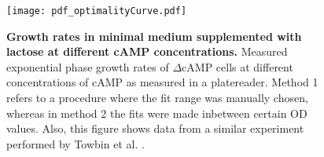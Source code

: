 \begin{figure}
    \centering
    \texttt{[image: pdf\_optimalityCurve.pdf]}
    \caption{ 
        \textbf{Growth rates in minimal medium supplemented with lactose at different cAMP concentrations.}
        Measured exponential phase growth rates of $\Delta$cAMP cells at different concentrations of cAMP as measured in a platereader.
        Method 1 refers to a procedure where the fit range was manually chosen, whereas in method 2 the fits were made inbetween certain OD values.
        Also, this figure shows data from a similar experiment performed by Towbin et al. \cite{Towbin2017}.
    }
    \label{fig:CRP:ocurvePlatereader}
\end{figure}


